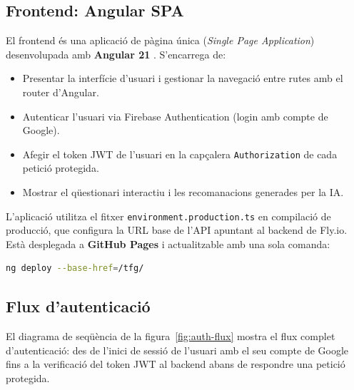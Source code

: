 \documentclass[12pt,a4paper]{article}
\begin{document}
\subsection{Frontend: Angular SPA}

El frontend és una aplicació de pàgina única (\textit{Single Page Application}) desenvolupada amb \textbf{Angular 21} \cite{angular2024}. S'encarrega de:

\begin{itemize}
    \item Presentar la interfície d'usuari i gestionar la navegació entre rutes amb el router d'Angular.
    \item Autenticar l'usuari via Firebase Authentication (login amb compte de Google).
    \item Afegir el token JWT de l'usuari en la capçalera \texttt{Authorization} de cada petició protegida.
    \item Mostrar el qüestionari interactiu i les recomanacions generades per la IA.
\end{itemize}

L'aplicació utilitza el fitxer \texttt{environment.production.ts} en compilació de producció, que configura la URL base de l'API apuntant al backend de Fly.io. Està desplegada a \textbf{GitHub Pages} i actualitzable amb una sola comanda:

\begin{lstlisting}[language=bash]
ng deploy --base-href=/tfg/
\end{lstlisting}

\subsection{Flux d'autenticació}

El diagrama de seqüència de la figura~\ref{fig:auth-flux} mostra el flux complet d'autenticació: des de l'inici de sessió de l'usuari amb el seu compte de Google fins a la verificació del token JWT al backend abans de respondre una petició protegida.
\end{document}
